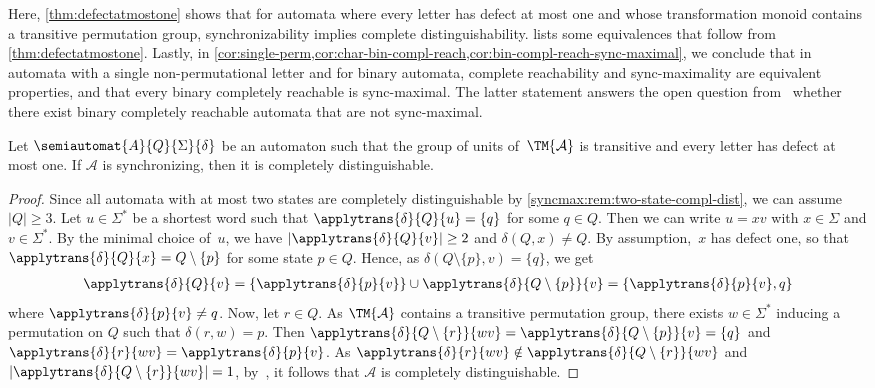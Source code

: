 
Here, \cref{thm:defectatmostone}
shows that for automata where every letter has defect at most one
and whose transformation monoid contains
a transitive permutation group, synchronizability implies complete distinguishability.
 lists some equivalences that follow
from \cref{thm:defectatmostone}.
Lastly, in \cref{cor:single-perm,cor:char-bin-compl-reach,cor:bin-compl-reach-sync-maximal},
we conclude that in automata with a single non-permutational letter	
and for binary automata, complete reachability
and sync-maximality are equivalent properties,
and that every binary completely reachable is sync-maximal.
The latter statement answers the open question
from~\cite{HoffmannCircularExtended} whether there exist 
binary completely reachable automata that are not sync-maximal.

\begin{theorem}\label{thm:defectatmostone}
	Let $\semiautomat{A}{Q}{\Sigma}{\delta}$
	be an automaton such that the group of units of~$\TM{\mathcal A}$
	is transitive and every letter has defect at most one.
	If $\mathcal A$ is synchronizing, then it is completely distinguishable.	
\end{theorem}
\begin{proof}
	Since all automata with at most two states are completely distinguishable by \cref{syncmax:rem:two-state-compl-dist},
	we can assume $|Q| \ge 3$.
	Let $u \in \Sigma^*$ be a shortest word such that
	$\applytrans{\delta}{Q}{u} = \{q\}$ for some $q \in Q$.
	Then we can write $u = xv$  with  $x \in \Sigma$ and $v \in \Sigma^*$.
	By the minimal choice of~$u$, we have $|\applytrans{\delta}{Q}{v}| \ge 2$
	and $\delta(Q, x) \ne Q$.
	By assumption,~$x$ has defect one,
	so that $\applytrans{\delta}{Q}{x} = Q \setminus \{p\}$
	for some state $p \in Q$.
	Hence, as $\delta(Q \setminus \{p\}, v) = \{q\}$, we get
	\begin{align*}
		\applytrans{\delta}{Q}{v}  = \{\applytrans{\delta}{p}{v} \} \cup \applytrans{\delta}{Q \setminus \{p\}}{v} 
		= \{ \applytrans{\delta}{p}{v}, q \}
	\end{align*}
	where $\applytrans{\delta}{p}{v} \ne q$.    
	Now, let $r \in Q$.	
	As $\TM{\mathcal A}$ contains a transitive permutation group, 
	there exists $w \in \Sigma^*$ inducing a permutation on $Q$
	such that $\delta(r, w) = p$.
	Then 
	$\applytrans{\delta}{Q \setminus \{r\}}{wv} = \applytrans{\delta}{Q\setminus\{p\}}{v} = \{q\}$
	and $\applytrans{\delta}{r}{wv} = \applytrans{\delta}{p}{v}$.
	As $\applytrans{\delta}{r}{wv} \notin \applytrans{\delta}{Q \setminus\{r\}}{wv}$
	and $|\applytrans{\delta}{Q\setminus \{r\}}{wv}| = 1$,
	by~,
	it follows that $\mathcal A$ is completely distinguishable.
\end{proof}

